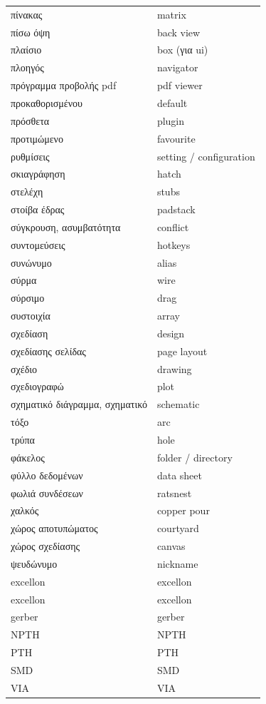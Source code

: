 \documentclass[a4paper]{article}
\begin{document}
\begin{longtabu}{ l l }
    πίνακας	&	matrix	\\
    πίσω όψη	&	back view	\\
    πλαίσιο	&	box (για ui)	\\
    πλοηγός	&	navigator	\\
    πρόγραμμα προβολής pdf	&	pdf viewer	\\
    προκαθορισμένου	&	default	\\
    πρόσθετα	&	plugin	\\
    προτιμώμενο	&	favourite	\\
    ρυθμίσεις	&	setting / configuration	\\
    σκιαγράφηση	&	hatch	\\
    στελέχη	&	stubs	\\
    στοίβα έδρας	&	padstack	\\
    σύγκρουση, ασυμβατότητα	&	conflict	\\
    συντομεύσεις	&	hotkeys	\\
    συνώνυμο	&	alias	\\
    σύρμα	&	wire	\\
    σύρσιμο	&	drag	\\
    συστοιχία	&	array	\\
    σχεδίαση	&	design	\\
    σχεδίασης σελίδας	&	page layout	\\
    σχέδιο	&	drawing	\\
    σχεδιογραφώ	&	plot	\\
    σχηματικό διάγραμμα, σχηματικό	&	schematic	\\
    τόξο	&	arc	\\
    τρύπα	&	hole	\\
    φάκελος	&	folder / directory	\\
    φύλλο δεδομένων	&	data sheet	\\
    φωλιά συνδέσεων	&	ratsnest	\\
    χαλκός	&	copper pour	\\
    χώρος αποτυπώματος	&	courtyard	\\
    χώρος σχεδίασης	&	canvas	\\
    ψευδώνυμο	&	nickname	\\
    excellon	&	excellon	\\
    excellon	&	excellon	\\
    gerber	&	gerber	\\
    NPTH	&	NPTH	\\
    PTH	&	PTH	\\
    SMD	&	SMD	\\
    VIA	&	VIA	\\
\end{longtabu}
\end{document}
